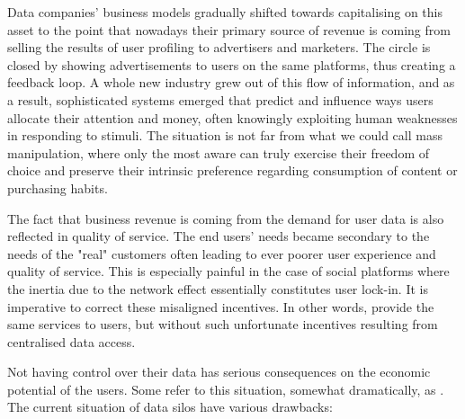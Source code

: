 Data companies' business models gradually shifted towards capitalising on this asset to the point that nowadays their primary source of revenue is coming from selling the results of user profiling to advertisers and marketers. The circle is closed by showing advertisements to users on the same platforms, thus creating a feedback loop. A whole new industry grew out of this flow of information, and as a result, sophisticated systems emerged that predict and influence ways users allocate their attention and money, often knowingly exploiting human weaknesses in responding to stimuli. The situation is not far from what we could call mass manipulation, where only the most aware can truly exercise their freedom of choice and preserve their intrinsic preference regarding consumption of content or purchasing habits.

The fact that business revenue is coming from the demand for user data is also reflected in quality of service. The end users' needs became secondary to the needs of the "real" customers often leading to ever poorer user experience and quality of service. This is especially painful in the case of social platforms where the inertia due to the network effect essentially constitutes user lock-in. It is imperative to correct these misaligned incentives. In other words, provide the same services to users, but without such unfortunate incentives resulting from centralised data access.

Not having control over their data has serious consequences on the  economic potential of the users. Some refer to this situation, somewhat dramatically, as . 
The current situation of data silos have various drawbacks: 


